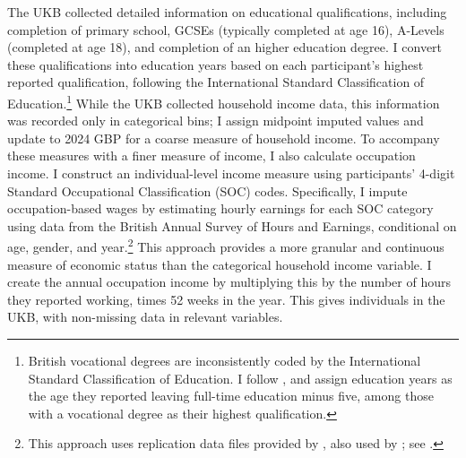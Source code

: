 The UKB collected detailed information on educational qualifications, including completion of primary school, GCSEs (typically completed at age 16), A-Levels (completed at age 18), and completion of an higher education degree.
I convert these qualifications into education years based on each participant's highest reported qualification, following the International Standard Classification of Education.\footnote{
    British vocational degrees are inconsistently coded by the International Standard Classification of Education.
    I follow \cite{okbay2022polygenic}, and assign education years as the age they reported leaving full-time education minus five, among those with a vocational degree as their highest qualification.
}
While the UKB collected household income data, this information was recorded only in categorical bins; I assign midpoint imputed values and update to 2024 GBP for a coarse measure of household income.
To accompany these measures with a finer measure of income, I also calculate occupation income.
I construct an individual-level income measure using participants' 4-digit Standard Occupational Classification (SOC) codes.
Specifically, I impute occupation-based wages by estimating hourly earnings for each SOC category using data from the British Annual Survey of Hours and Earnings, conditional on age, gender, and year.\footnote{
    This approach uses replication data files provided by \cite{kweon2025associations}, also used by \cite{carvalho2024genetics}; see .
}
This approach provides a more granular and continuous measure of economic status than the categorical household income variable.
I create the annual occupation income by multiplying this by the number of hours they reported working, times 52 weeks in the year.
This gives individuals in the UKB, with non-missing data in relevant variables. 


